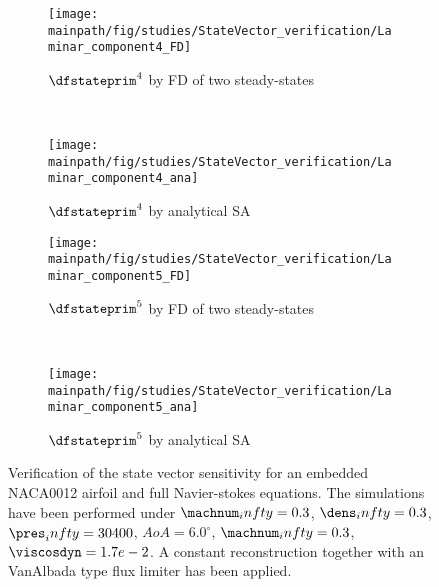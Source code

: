 \documentclass[../main.tex]{subfiles}
\begin{document}
\begin{figure*}[t!]
   
    \begin{subfigure}[t]{0.5\textwidth}
        \centering
        \texttt{[image: \\mainpath/fig/studies/StateVector\_verification/Laminar\_component4\_FD]}
        \caption{$\dfstateprim^4$ by \ac{FD} of two steady-states}
    \end{subfigure}%
    ~ 
    \begin{subfigure}[t]{0.5\textwidth}
        \centering
        \texttt{[image: \\mainpath/fig/studies/StateVector\_verification/Laminar\_component4\_ana]}
        \caption{$\dfstateprim^4$ by analytical \ac{SA}}
    \end{subfigure}
    
    
    \begin{subfigure}[t]{0.5\textwidth}
        \centering
        \texttt{[image: \\mainpath/fig/studies/StateVector\_verification/Laminar\_component5\_FD]}
        \caption{$\dfstateprim^5$ by \ac{FD} of two steady-states}
    \end{subfigure}%
    ~ 
    \begin{subfigure}[t]{0.5\textwidth}
        \centering
        \texttt{[image: \\mainpath/fig/studies/StateVector\_verification/Laminar\_component5\_ana]}
        \caption{$\dfstateprim^5$ by analytical \ac{SA}}
    \end{subfigure}
    \caption[State-vector sensitivity verification embedded laminar flow]{Verification of the state vector sensitivity for an embedded NACA0012 airfoil and full Navier-stokes equations. The simulations have been performed under $\machnum_infty=0.3$, $\dens_infty=0.3$, $\pres_infty=30400$, $AoA=6.0^{\circ}$, $\machnum_infty=0.3$, $\viscosdyn=1.7e-2$. A constant reconstruction together with an VanAlbada type flux limiter has been applied.}
    \label{fig:dwds_verification_embedded_viscous}
    
\end{figure*}
\end{document}
